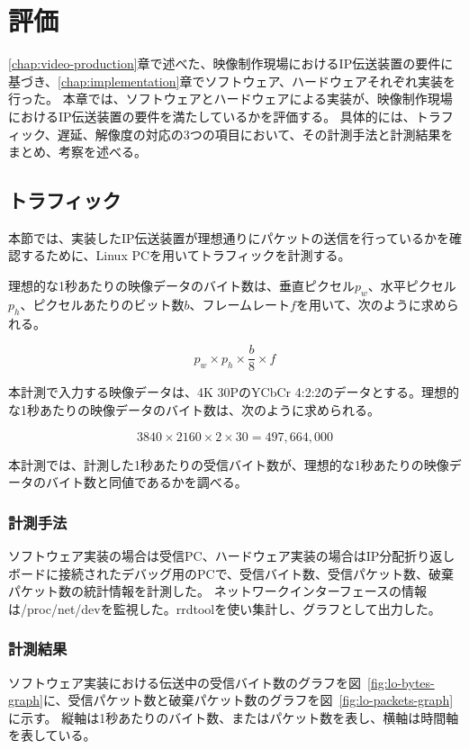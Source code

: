 \chapter{評価}
\label{chap:evaluation}

\ref{chap:video-production}章で述べた、映像制作現場におけるIP伝送装置の要件に基づき、\ref{chap:implementation}章でソフトウェア、ハードウェアそれぞれ実装を行った。
本章では、ソフトウェアとハードウェアによる実装が、映像制作現場におけるIP伝送装置の要件を満たしているかを評価する。
具体的には、トラフィック、遅延、解像度の対応の3つの項目において、その計測手法と計測結果をまとめ、考察を述べる。

\section{トラフィック}

本節では、実装したIP伝送装置が理想通りにパケットの送信を行っているかを確認するために、Linux PCを用いてトラフィックを計測する。

理想的な1秒あたりの映像データのバイト数は、垂直ピクセル$p_w$、水平ピクセル$p_h$、ピクセルあたりのビット数$b$、フレームレート$f$を用いて、次のように求められる。

\[ p_w \times p_h \times \frac{b}{8} \times f \]

本計測で入力する映像データは、4K 30PのYCbCr 4:2:2のデータとする。理想的な1秒あたりの映像データのバイト数は、次のように求められる。

\[ 3840 \times 2160 \times 2 \times 30 = 497,664,000 \]

本計測では、計測した1秒あたりの受信バイト数が、理想的な1秒あたりの映像データのバイト数と同値であるかを調べる。

\subsection{計測手法}

ソフトウェア実装の場合は受信PC、ハードウェア実装の場合はIP分配折り返しボードに接続されたデバッグ用のPCで、受信バイト数、受信パケット数、破棄パケット数の統計情報を計測した。
ネットワークインターフェースの情報は/proc/net/devを監視した。rrdtoolを使い集計し、グラフとして出力した。

\subsection{計測結果}

ソフトウェア実装における伝送中の受信バイト数のグラフを図~\ref{fig:lo-bytes-graph}に、受信パケット数と破棄パケット数のグラフを図~\ref{fig:lo-packets-graph}に示す。
縦軸は1秒あたりのバイト数、またはパケット数を表し、横軸は時間軸を表している。

